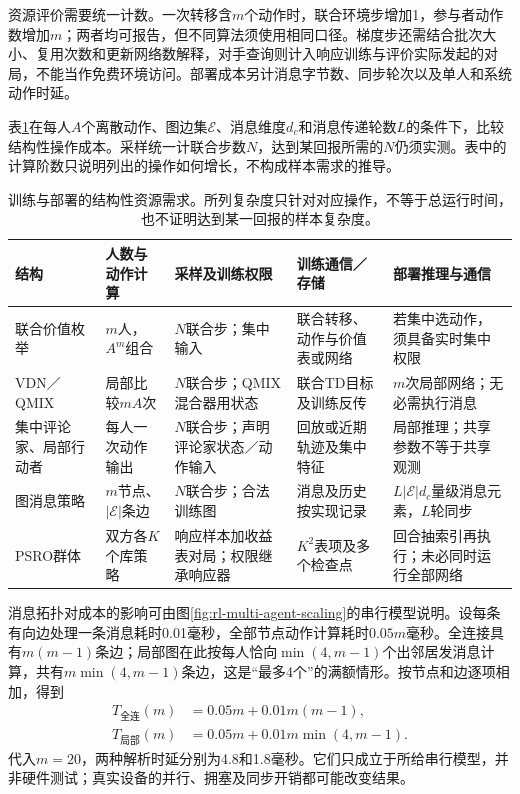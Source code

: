 资源评价需要统一计数。一次转移含$m$个动作时，联合环境步增加1，参与者动作数增加$m$；两者均可报告，但不同算法须使用相同口径。梯度步还需结合批次大小、复用次数和更新网络数解释，对手查询则计入响应训练与评价实际发起的对局，不能当作免费环境访问。部署成本另计消息字节数、同步轮次以及单人和系统动作时延。

表\ref{tab:rl-multi-agent-resources}在每人$A$个离散动作、图边集$\mathcal E$、消息维度$d_c$和消息传递轮数$L$的条件下，比较结构性操作成本。采样统一计联合步数$N$，达到某回报所需的$N$仍须实测。表中的计算阶数只说明列出的操作如何增长，不构成样本需求的推导。

\begin{table}[htbp]
 \centering
 \begin{tabularx}{\linewidth}{@{}l >{\raggedright\arraybackslash}X >{\raggedright\arraybackslash}X >{\raggedright\arraybackslash}X >{\raggedright\arraybackslash}X@{}}
 \toprule
 结构 & 人数与动作计算 & 采样及训练权限 & 训练通信／存储 & 部署推理与通信\\
 \midrule
 联合价值枚举 & $m$人，$A^m$组合 & $N$联合步；集中输入 & 联合转移、动作与价值表或网络 & 若集中选动作，须具备实时集中权限\\
 VDN／QMIX & 局部比较$mA$次 & $N$联合步；QMIX混合器用状态 & 联合TD目标及训练反传 & $m$次局部网络；无必需执行消息\\
 集中评论家、局部行动者 & 每人一次动作输出 & $N$联合步；声明评论家状态／动作输入 & 回放或近期轨迹及集中特征 & 局部推理；共享参数不等于共享观测\\
 图消息策略 & $m$节点、$|\mathcal E|$条边 & $N$联合步；合法训练图 & 消息及历史按实现记录 & $L|\mathcal E|d_c$量级消息元素，$L$轮同步\\
 PSRO群体 & 双方各$K$个库策略 & 响应样本加收益表对局；权限继承响应器 & $K^2$表项及多个检查点 & 回合抽索引再执行；未必同时运行全部网络\\
 \bottomrule
 \end{tabularx}
 \caption{训练与部署的结构性资源需求。所列复杂度只针对对应操作，不等于总运行时间，也不证明达到某一回报的样本复杂度。}
 \label{tab:rl-multi-agent-resources}
\end{table}

消息拓扑对成本的影响可由图\ref{fig:rl-multi-agent-scaling}的串行模型说明。设每条有向边处理一条消息耗时0.01毫秒，全部节点动作计算耗时$0.05m$毫秒。全连接具有$m(m-1)$条边；局部图在此按每人恰向$\min(4,m-1)$个出邻居发消息计算，共有$m\min(4,m-1)$条边，这是“最多4个”的满额情形。按节点和边逐项相加，得到
\[
 \begin{aligned}
 T_{\text{全连}}(m)&=0.05m+0.01m(m-1),\\
 T_{\text{局部}}(m)&=0.05m+0.01m\min(4,m-1).
 \end{aligned}
\]
代入$m=20$，两种解析时延分别为4.8和1.8毫秒。它们只成立于所给串行模型，并非硬件测试；真实设备的并行、拥塞及同步开销都可能改变结果。

